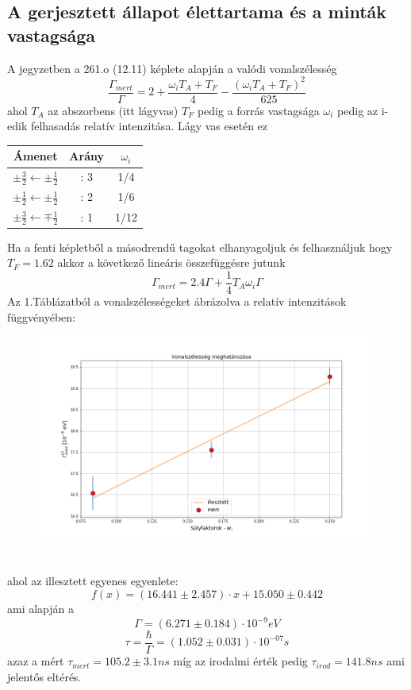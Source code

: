 \documentclass[a4paper,12pt]{article}
\numberwithin{equation}{subsection}
\begin{document}
\subsection{A gerjesztett állapot élettartama és a minták vastagsága}
A jegyzetben a 261.o (12.11) képlete alapján a valódi vonalszélesség
\[\frac{\Gamma_{mert}}{\Gamma}=2+\frac{\omega_iT_A+T_F}{4}-\frac{(\omega_iT_A+T_F)^2}{625}\] ahol $T_A$ az abszorbens (itt lágyvas) $T_F$ pedig a forrás vastagsága $\omega_i$ pedig az i-edik felhasadás relatív intenzitása. Lágy vas esetén ez 
\begin{table}[h!]
\centering
\begin{tabular}{c c c}
Ámenet&Arány&$\omega_i$ \\ \hline
$\pm \frac{3}{2}\leftarrow\pm\frac{1}{2}$& : 3 &1/4\\
$\pm \frac{1}{2}\leftarrow\pm\frac{1}{2}$& : 2&1/6\\
$\pm \frac{3}{2}\leftarrow\mp\frac{1}{2}$& : 1&1/12\\

\end{tabular}
\end{table}
Ha a fenti képletből a másodrendű tagokat elhanyagoljuk és felhasználjuk hogy $T_F=1.62$ akkor a következő lineáris összefüggésre jutunk
\[\Gamma_{mert}=2.4\Gamma+\frac{1}{4}T_A\omega_i\Gamma\]
Az 1.Táblázatból a vonalszélességeket ábrázolva a relatív intenzitások függvényében:
\begin{figure}[h!]
\centering
\includegraphics[width=12cm]{vonalszelesseg.png}
\end{figure}
\\ ahol az illesztett egyenes egyenlete: \[f(x)=(16.441\pm2.457)\cdot x+15.050\pm0.442\] ami alapján a \[\Gamma=(6.271\pm 0.184)\cdot10^{-9} eV\] \[\tau=\frac{\hbar}{\Gamma}=(1.052\pm 0.031)\cdot10^{-07} s\]
azaz a mért $\tau_{mert}=105.2\pm3.1 ns$ míg az irodalmi érték pedig $\tau_{irod}=141.8ns$ ami jelentős eltérés.
\end{document}
